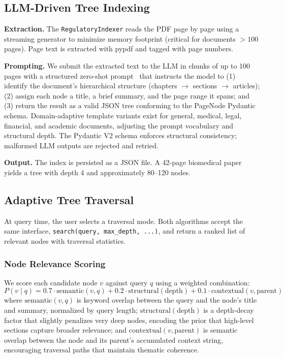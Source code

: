 \documentclass[sigconf,review,anonymous]{acmart}
\begin{document}
\subsection{LLM-Driven Tree Indexing}
\textbf{Extraction.} The \texttt{RegulatoryIndexer} reads the PDF page by page
using a streaming generator to minimize memory footprint (critical for documents
$>100$ pages). Page text is extracted with pypdf and tagged with page numbers.

\textbf{Prompting.} We submit the extracted text to the LLM in chunks of up to
100 pages with a structured zero-shot prompt~\cite{brown2020gpt3,kojima2022zero}
that instructs the model to (1) identify the document's hierarchical structure
(chapters $\rightarrow$ sections $\rightarrow$ articles); (2) assign each node a
title, a brief summary, and the page range it spans; and (3) return the result as
a valid JSON tree conforming to the PageNode Pydantic schema. Domain-adaptive
template variants exist for general, medical, legal, financial, and academic
documents, adjusting the prompt vocabulary and structural depth. The Pydantic V2
schema enforces structural consistency; malformed LLM outputs are rejected and
retried.

\textbf{Output.} The index is persisted as a JSON file. A 42-page biomedical
paper yields a tree with depth 4 and approximately 80--120 nodes.

\subsection{Adaptive Tree Traversal}
At query time, the user selects a traversal mode. Both algorithms accept the same
interface, \texttt{search(query, max\_depth, ...)}, and return a ranked list of
relevant nodes with traversal statistics.

\subsubsection{Node Relevance Scoring}
We score each candidate node $v$ against query $q$ using a weighted combination:
\begin{equation}
P(v\mid q)=0.7\cdot\mathrm{semantic}(v,q)+0.2\cdot\mathrm{structural}(\mathrm{depth})+0.1\cdot\mathrm{contextual}(v,\mathrm{parent})
\end{equation}
where $\mathrm{semantic}(v,q)$ is keyword overlap between the query and the
node's title and summary, normalized by query length;
$\mathrm{structural}(\mathrm{depth})$ is a depth-decay factor that slightly
penalizes very deep nodes, encoding the prior that high-level sections capture
broader relevance; and $\mathrm{contextual}(v,\mathrm{parent})$ is semantic
overlap between the node and its parent's accumulated context string,
encouraging traversal paths that maintain thematic coherence.
\end{document}
